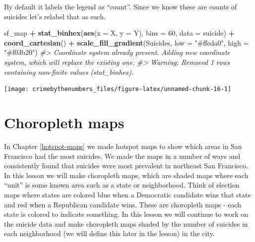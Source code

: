 \documentclass[
  12pt,
]{book}
\newenvironment{Shaded}{\begin{snugshade}}{\end{snugshade}}
\newcommand{\CommentTok}[1]{\textcolor[rgb]{0.37,0.37,0.37}{\textit{#1}}}
\newcommand{\DataTypeTok}[1]{\textcolor[rgb]{0.27,0.27,0.27}{#1}}
\newcommand{\DecValTok}[1]{\textcolor[rgb]{0.06,0.06,0.06}{#1}}
\newcommand{\KeywordTok}[1]{\textcolor[rgb]{0.27,0.27,0.27}{\textbf{#1}}}
\newcommand{\NormalTok}[1]{#1}
\newcommand{\OperatorTok}[1]{\textcolor[rgb]{0.43,0.43,0.43}{\textbf{#1}}}
\newcommand{\StringTok}[1]{\textcolor[rgb]{0.5,0.5,0.5}{#1}}
\begin{document}
By default it labels the legend as ``count''. Since we know these are counts of suicides let's relabel that as such.

\begin{Shaded}
\begin{Highlighting}[]
\NormalTok{sf\_map }\OperatorTok{+}
\StringTok{  }\KeywordTok{stat\_binhex}\NormalTok{(}\KeywordTok{aes}\NormalTok{(}\DataTypeTok{x =}\NormalTok{ X, }\DataTypeTok{y =}\NormalTok{ Y),}
              \DataTypeTok{bins  =} \DecValTok{60}\NormalTok{,}
              \DataTypeTok{data =}\NormalTok{ suicide) }\OperatorTok{+}
\StringTok{  }\KeywordTok{coord\_cartesian}\NormalTok{() }\OperatorTok{+}
\StringTok{  }\KeywordTok{scale\_fill\_gradient}\NormalTok{(}\StringTok{\textquotesingle{}Suicides\textquotesingle{}}\NormalTok{,}
                      \DataTypeTok{low =} \StringTok{"\#ffeda0"}\NormalTok{,}
                      \DataTypeTok{high =} \StringTok{"\#f03b20"}\NormalTok{)}
\CommentTok{\#> Coordinate system already present. Adding new coordinate system, which will replace the existing one.}
\CommentTok{\#> Warning: Removed 1 rows containing non{-}finite values (stat\_binhex).}
\end{Highlighting}
\end{Shaded}

\begin{center}\texttt{[image: crimebythenumbers\_files/figure-latex/unnamed-chunk-16-1]} \end{center}

\hypertarget{choropleth-maps}{%
\chapter{Choropleth maps}\label{choropleth-maps}}

In Chapter \ref{hotspot-maps} we made hotspot maps to show which areas in San Francisco had the most suicides. We made the maps in a number of ways and consistently found that suicides were most prevalent in northeast San Francisco. In this lesson we will make choropleth maps, which are shaded maps where each ``unit'' is some known area such as a state or neighborhood. Think of election maps where states are colored blue when a Democratic candidate wins that state and red when a Republican candidate wins. These are choropleth maps - each state is colored to indicate something. In this lesson we will continue to work on the suicide data and make choropleth maps shaded by the number of suicides in each neighborhood (we will define this later in the lesson) in the city.
\end{document}
